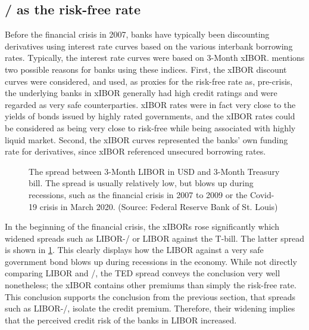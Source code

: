 \documentclass[main.tex]{subfiles}
\begin{document}
    \subsection{\OIS/ as the risk-free rate}
    
    Before the financial crisis in 2007, banks have typically been discounting
    derivatives using interest rate curves based on the various interbank borrowing rates.
    Typically, the interest rate curves were based on 3-Month xIBOR.
    \textcite[Section 8.6]{Green2015XVA} 
    mentions two possible reasons for banks using these indices.
    First, the xIBOR discount curves were considered, and used, as proxies for the risk-free rate
    as, pre-crisis, the underlying banks in xIBOR generally had high credit ratings
    and were regarded as very safe counterparties.
    xIBOR rates were in fact very close to the yields of bonds issued by highly rated governments,
    and the xIBOR rates could be considered as being very close to risk-free 
    while being associated with highly liquid market.
    Second, the xIBOR curves represented the banks' own funding rate for derivatives, since
    xIBOR referenced unsecured borrowing rates.

    \begin{figure}
        \centering
        \resizebox{\textwidth}{!}{%
            
        }
        \caption{
            The spread between 3-Month LIBOR in USD and 3-Month Treasury bill.
            The spread is usually relatively low, 
            but blows up during recessions, 
            such as the financial crisis in 2007 to 2009 or
            the Covid-19 crisis in March 2020.
            (Source: Federal Reserve Bank of St. Louis)
        }
        \label{fig:ted-spread}
    \end{figure}

    In the beginning of the financial crisis, the xIBORs rose significantly
    which widened spreads such as LIBOR-\OIS/ or LIBOR against the T-bill.
    The latter spread is shown in \cref{fig:ted-spread}. This clearly 
    displays how the LIBOR against a very safe government bond blows up
    during recessions in the economy. 
    While not directly comparing LIBOR and \OIS/, 
    the TED spread conveys the conclusion very well nonetheless;
    the xIBOR contains other premiums than simply the risk-free rate.
    This conclusion supports the conclusion from the previous section,
    that spreads such as LIBOR-\OIS/, isolate the credit premium.
    Therefore, their widening implies that the perceived credit risk of the banks in LIBOR increased.
\end{document}
